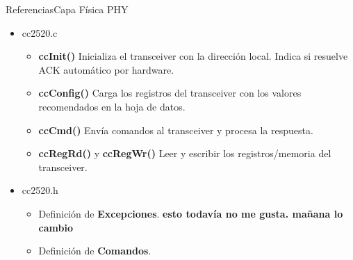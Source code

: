 \documentclass[aspectratio=169]{beamer}
\begin{document}
\begin{frame}[t]{Referencias}{Capa Física PHY}
	\begin{itemize}
		\item cc2520.c
		\vspace{10px}
		\begin{itemize}
			\item \textbf{ccInit()} Inicializa el transceiver con la dirección local. Indica si resuelve ACK automático por hardware.
			\vspace{5px}
			\item \textbf{ccConfig()} Carga los registros del transceiver con los valores recomendados en la hoja de datos.
			\vspace{5px}
			\item \textbf{ccCmd()} Envía comandos al transceiver y procesa la respuesta.
			\vspace{5px}
			\item \textbf{ccRegRd()} y \textbf{ccRegWr()} Leer y escribir los registros/memoria del transceiver.
		\end{itemize}
		\vspace{10px}
		\item cc2520.h
		\vspace{10px}
		\begin{itemize}
			\item Definición de \textbf{Excepciones}.  \textbf{esto todavía no me gusta. mañana lo cambio}
			\vspace{5px}
			\item Definición de \textbf{Comandos}.
		\end{itemize}	
	\end{itemize}

\end{frame}
\end{document}
